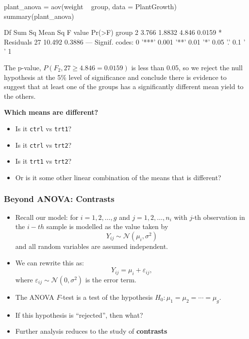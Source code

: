 \documentclass[a4paper]{article}
\begin{document}
\begin{Schunk}
\begin{Sinput}
plant_anova = aov(weight ~ group, data = PlantGrowth)
summary(plant_anova)
\end{Sinput}
\begin{Soutput}
            Df Sum Sq Mean Sq F value Pr(>F)  
group        2  3.766  1.8832   4.846 0.0159 *
Residuals   27 10.492  0.3886                 
---
Signif. codes:  0 '***' 0.001 '**' 0.01 '*' 0.05 '.' 0.1 ' ' 1
\end{Soutput}
\end{Schunk}
The p-value, \( P(F_2,27 \geq 4.846 = 0.0159) \) is less than 0.05, so we reject the null hypothesis at the 5\% level of significance and conclude there is evidence to suggest that at least one of the groups has a significantly different mean yield to the others.
\begin{greenbox}
	\textbf{Which means are different?}
	\begin{itemize}
		\item Is it \lstinline|ctrl| vs \lstinline|trt1|?
		\item Is it \lstinline|ctrl| vs \lstinline|trt2|?
		\item Is it \lstinline|trt1| vs \lstinline|trt2|?
		\item Or is it some other linear combination of the means that is different?
	\end{itemize}
\end{greenbox}
\subsubsection{Beyond ANOVA: Contrasts}
\begin{itemize}
	\item Recall our model: for \( i = 1,2,\dotsc,g \) and \( j = 1,2, \dotsc,n_i \) with \( j \)-th observation in the \( i-th \) sample is modelled as the value taken by
	\[
		Y_{ij} \sim \mathcal{N} (\mu_i,\sigma^2)
	\]
	and all random variables are assumed independent.
	\item We can rewrite this as:
	\[
		Y_{ij} = \mu_i + \varepsilon_{ij},
	\]
	where \( \varepsilon_{ij} \sim \mathcal{N}(0,\sigma^2) \) is the error term.
	\item The ANOVA \( F \)-test is a test of the hypothesis \( H_0: \mu_1 = \mu_2 = \dotsb = \mu_g \).
	\item If this hypothesis is ``rejected'', then what?
	\item Further analysis reduces to the study of \textcolor{mygreen}{\textbf{contrasts}}
\end{itemize}
\end{document}

